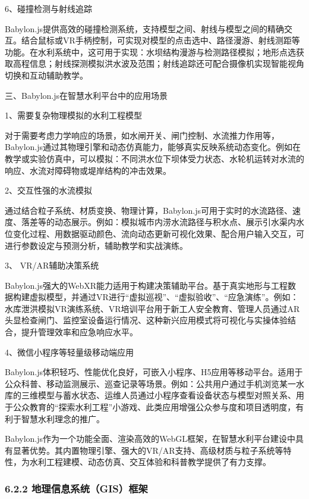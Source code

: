 6、碰撞检测与射线追踪

Babylon.js提供高效的碰撞检测系统，支持模型之间、射线与模型之间的精确交互。结合鼠标或VR手柄控制，可实现对模型的点击选中、路径漫游、射线测距等功能。在水利系统中，这可用于实现：水坝结构漫游与检测路径模拟；地形点选获取高程信息；射线探测模拟洪水波及范围；射线追踪还可配合摄像机实现智能视角切换和互动辅助教学。

三、Babylon.js在智慧水利平台中的应用场景

1、需要复杂物理模拟的水利工程模型

对于需要考虑力学响应的场景，如水闸开关、闸门控制、水流推力作用等，Babylon.js通过其物理引擎和动态仿真能力，能够真实反映系统动态变化。例如在教学或实验仿真中，可以模拟：不同洪水位下坝体受力状态、水轮机运转对水流的响应、水流对障碍物或堤岸结构的冲击效果。

2、交互性强的水流模拟

通过结合粒子系统、材质变换、物理计算，Babylon.js可用于实时的水流路径、速度、落差等的动态展示。例如：模拟城市内涝水流路径与积水点、展示引水渠内水位变化过程、用数据驱动颜色、流向动态更新可视化效果、配合用户输入交互，可进行参数设定与预测分析，辅助教学和实战演练。

3、 VR/AR辅助决策系统

Babylon.js强大的WebXR能力适用于构建决策辅助平台。基于真实地形与工程数据构建虚拟模型，并通过VR进行``虚拟巡视''、``虚拟验收''、``应急演练''。例如：水库泄洪模拟VR演练系统、VR培训平台用于新工人安全教育、管理人员通过AR头显检查闸门、监控室设备运行情况、这种新兴应用模式将可视化与实操体验结合，提升管理效率和应急响应水平。

4、微信小程序等轻量级移动端应用

Babylon.js体积轻巧、性能优化良好，可嵌入小程序、H5应用等移动平台。适用于公众科普、移动监测展示、巡查记录等场景。例如：公共用户通过手机浏览某一水库的三维模型与蓄水状态、运维人员通过小程序查看设备状态与模型对照关系、用于公众教育的``探索水利工程''小游戏、此类应用增强公众参与度和项目透明度，有利于智慧水利理念的推广。

Babylon.js作为一个功能全面、渲染高效的WebGL框架，在智慧水利平台建设中具有显著优势。其内置物理引擎、强大的VR/AR支持、高级材质与粒子系统等特性，为水利工程建模、动态仿真、交互体验和科普教学提供了有力支撑。

\subsubsection{6.2.2 地理信息系统（GIS）框架}\label{ux5730ux7406ux4fe1ux606fux7cfbux7edfgisux6846ux67b6}

